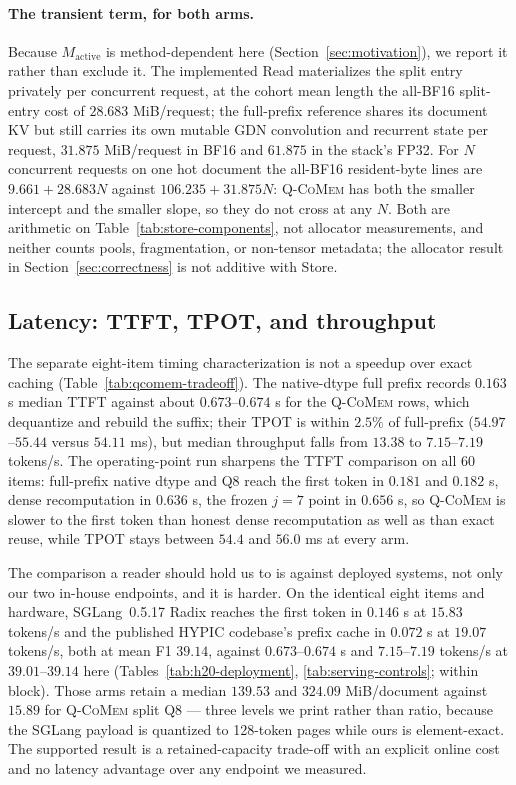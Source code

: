 \documentclass{article}
\newcommand{\qcomem}{\textsc{Q-CoMem}}
\begin{document}
\paragraph{The transient term, for both arms.}
Because $M_{\mathrm{active}}$ is method-dependent here
(Section~\ref{sec:motivation}), we report it rather than exclude it.  The
implemented Read materializes the split entry privately per concurrent request,
at the cohort mean length the all-BF16 split-entry cost of $28.683$ MiB/request;
the full-prefix reference shares its document KV but still carries its own
mutable GDN convolution and recurrent state per request, $31.875$ MiB/request in
BF16 and $61.875$ in the stack's FP32.  For $N$ concurrent requests on one hot
document the all-BF16 resident-byte lines are $9.661+28.683N$ against
$106.235+31.875N$: \qcomem{} has both the smaller intercept and the smaller
slope, so they do not cross at any $N$.  Both are arithmetic on
Table~\ref{tab:store-components}, not allocator measurements, and neither counts
pools, fragmentation, or non-tensor metadata; the allocator result in
Section~\ref{sec:correctness} is not additive with Store.



\subsection{Latency: TTFT, TPOT, and throughput}
\label{sec:latency}

The separate eight-item timing characterization is not a speedup over exact
caching (Table~\ref{tab:qcomem-tradeoff}). The native-dtype full prefix records
$0.163$ s median TTFT against about $0.673$--$0.674$ s for the \qcomem{} rows,
which dequantize and rebuild the suffix; their TPOT is within $2.5\%$ of
full-prefix ($54.97$--$55.44$ versus $54.11$ ms), but median throughput falls
from $13.38$ to $7.15$--$7.19$ tokens/s.  The operating-point run sharpens the
TTFT comparison on all 60 items: full-prefix native dtype and Q8 reach the first
token in $0.181$ and $0.182$ s, dense recomputation in $0.636$ s, the frozen
$j=7$ point in $0.656$ s, so \qcomem{} is slower to the first token than honest
dense recomputation as well as than exact reuse, while TPOT stays between $54.4$
and $56.0$ ms at every arm.

The comparison a reader should hold us to is against deployed systems, not only
our two in-house endpoints, and it is harder.  On the identical eight items and
hardware, SGLang~0.5.17 Radix reaches the first token in $0.146$ s at $15.83$
tokens/s and the published HYPIC codebase's prefix cache in $0.072$ s at $19.07$
tokens/s, both at mean F1 $39.14$, against $0.673$--$0.674$ s and
$7.15$--$7.19$ tokens/s at $39.01$--$39.14$ here
(Tables~\ref{tab:h20-deployment}, \ref{tab:serving-controls}; within block).
Those arms retain a median $139.53$ and $324.09$ MiB/document against $15.89$
for \qcomem{} split Q8 --- three levels we print rather than ratio, because the
SGLang payload is quantized to 128-token pages while ours is element-exact.  The
supported result is a retained-capacity trade-off with an explicit online cost
and no latency advantage over any endpoint we measured.
\end{document}
